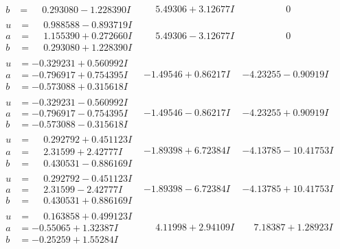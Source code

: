 \documentclass[1p]{elsarticle_modified}
\theoremstyle{definition}
\begin{document}
$$\begin{array}{c|c|c}
\begin{aligned}
b &= \phantom{-}0.293080 - 1.228390 I\end{aligned}
 & \phantom{-}5.49306 + 3.12677 I & \phantom{-0.000000 } 0 \\ \hline\begin{aligned}
u &= \phantom{-}0.988588 - 0.893719 I \\
a &= \phantom{-}1.155390 + 0.272660 I \\
b &= \phantom{-}0.293080 + 1.228390 I\end{aligned}
 & \phantom{-}5.49306 - 3.12677 I & \phantom{-0.000000 } 0 \\ \hline\begin{aligned}
u &= -0.329231 + 0.560992 I \\
a &= -0.796917 + 0.754395 I \\
b &= -0.573088 + 0.315618 I\end{aligned}
 & -1.49546 + 0.86217 I & -4.23255 - 0.90919 I \\ \hline\begin{aligned}
u &= -0.329231 - 0.560992 I \\
a &= -0.796917 - 0.754395 I \\
b &= -0.573088 - 0.315618 I\end{aligned}
 & -1.49546 - 0.86217 I & -4.23255 + 0.90919 I \\ \hline\begin{aligned}
u &= \phantom{-}0.292792 + 0.451123 I \\
a &= \phantom{-}2.31599 + 2.42777 I \\
b &= \phantom{-}0.430531 - 0.886169 I\end{aligned}
 & -1.89398 + 6.72384 I & -4.13785 - 10.41753 I \\ \hline\begin{aligned}
u &= \phantom{-}0.292792 - 0.451123 I \\
a &= \phantom{-}2.31599 - 2.42777 I \\
b &= \phantom{-}0.430531 + 0.886169 I\end{aligned}
 & -1.89398 - 6.72384 I & -4.13785 + 10.41753 I \\ \hline\begin{aligned}
u &= \phantom{-}0.163858 + 0.499123 I \\
a &= -0.55065 + 1.32387 I \\
b &= -0.25259 + 1.55284 I\end{aligned}
 & \phantom{-}4.11998 + 2.94109 I & \phantom{-}7.18387 + 1.28923 I \\ \hline\begin{aligned}

\end{aligned}
\end{array}$$
\end{document}
